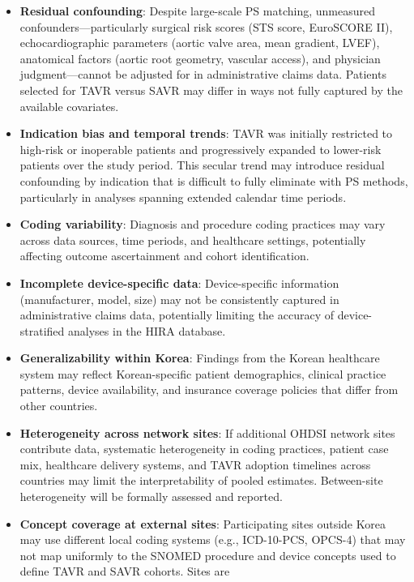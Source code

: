 \documentclass[
  12pt,
]{article}
\providecommand{\tightlist}{%
  \setlength{\itemsep}{0pt}\setlength{\parskip}{0pt}}
\begin{document}
\begin{itemize}
\tightlist
\item
  \textbf{Residual confounding}: Despite large-scale PS matching,
  unmeasured confounders---particularly surgical risk scores (STS score,
  EuroSCORE II), echocardiographic parameters (aortic valve area, mean
  gradient, LVEF), anatomical factors (aortic root geometry, vascular
  access), and physician judgment---cannot be adjusted for in
  administrative claims data. Patients selected for TAVR versus SAVR may
  differ in ways not fully captured by the available covariates.
\item
  \textbf{Indication bias and temporal trends}: TAVR was initially
  restricted to high-risk or inoperable patients and progressively
  expanded to lower-risk patients over the study period. This secular
  trend may introduce residual confounding by indication that is
  difficult to fully eliminate with PS methods, particularly in analyses
  spanning extended calendar time periods.
\item
  \textbf{Coding variability}: Diagnosis and procedure coding practices
  may vary across data sources, time periods, and healthcare settings,
  potentially affecting outcome ascertainment and cohort identification.
\item
  \textbf{Incomplete device-specific data}: Device-specific information
  (manufacturer, model, size) may not be consistently captured in
  administrative claims data, potentially limiting the accuracy of
  device-stratified analyses in the HIRA database.
\item
  \textbf{Generalizability within Korea}: Findings from the Korean
  healthcare system may reflect Korean-specific patient demographics,
  clinical practice patterns, device availability, and insurance
  coverage policies that differ from other countries.
\item
  \textbf{Heterogeneity across network sites}: If additional OHDSI
  network sites contribute data, systematic heterogeneity in coding
  practices, patient case mix, healthcare delivery systems, and TAVR
  adoption timelines across countries may limit the interpretability of
  pooled estimates. Between-site heterogeneity will be formally assessed
  and reported.
\item
  \textbf{Concept coverage at external sites}: Participating sites
  outside Korea may use different local coding systems (e.g.,
  ICD-10-PCS, OPCS-4) that may not map uniformly to the SNOMED procedure
  and device concepts used to define TAVR and SAVR cohorts. Sites are

\end{itemize}
\end{document}
